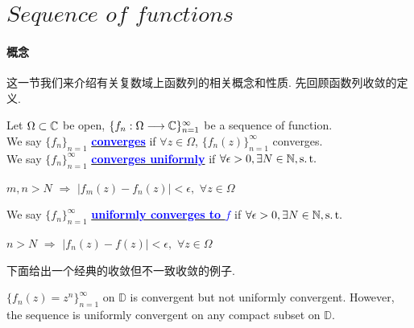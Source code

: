 \newpage

\section{$Sequence \,\, of \,\, functions$}
\paragraph{概念}
	这一节我们来介绍有关复数域上函数列的相关概念和性质. 先回顾函数列收敛的定义.
	\begin{defn}\label{def 5.4.1}
		Let $\Omega \subset \mathbb{C}$ be open, $\{ f_n : \Omega \longrightarrow \mathbb{C} \}_{n = 1}^{\infty}$ be a sequence of function. \\
		We say $\{ f_n \}_{n = 1}$ \underline{\textcolor{blue}{\textbf{converges}}} if $\forall z \in \Omega$, $\{ f_{n}(z) \}_{n = 1}^{\infty}$ converges.\\
		We say $\{ f_n \}_{n = 1}^{\infty}$ \underline{\textcolor{blue}{\textbf{converges uniformly}}} if $\forall \epsilon > 0 , \exists N \in \mathbb{N} , \operatorname{s.t.}$
		\begin{center}
			$m , n > N \,\, \Rightarrow \,\, \left| f_{m}(z) - f_{n}(z) \right| < \epsilon , \,\, \forall z \in \Omega$
		\end{center}
		We say $\{ f_n \}_{n = 1}^{\infty}$ \underline{\textcolor{blue}{\textbf{uniformly converges to $f$}}} if $\forall \epsilon > 0 , \exists N \in \mathbb{N} , \operatorname{s.t.}$
		\begin{center}
			$n > N \,\, \Rightarrow \,\, \left| f_{n}(z) - f(z) \right| < \epsilon , \,\, \forall z \in \Omega$
		\end{center}
	\end{defn}
	
	\vspace{2em}
	下面给出一个经典的收敛但不一致收敛的例子.
	\begin{example}\label{ex 5.4.1}
		$\{ f_{n}(z) = z^n \}_{n = 1}^{\infty}$ on $\mathbb{D}$ is convergent but not uniformly convergent. However, the sequence is uniformly convergent on any compact subset on $\mathbb{D}$.
	\end{example}

\vspace{2em}
